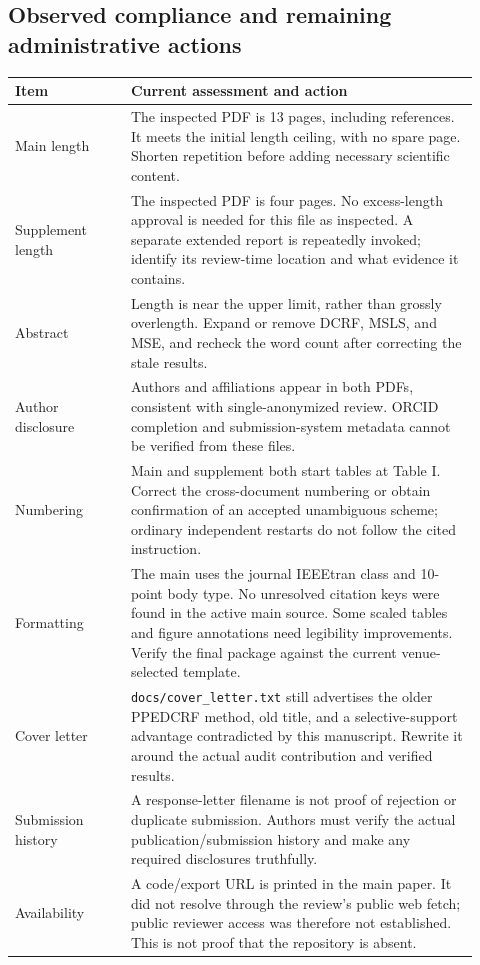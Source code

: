 \documentclass[11pt,a4paper]{article}
\newcommand{\file}[1]{\nolinkurl{#1}}
\begin{document}
\subsection{Observed compliance and remaining administrative actions}
\begin{longtable}{L{0.23\linewidth}L{0.69\linewidth}}
\toprule
Item & Current assessment and action \\
\midrule
\endhead
Main length & The inspected PDF is 13 pages, including references. It meets the initial length ceiling, with no spare page. Shorten repetition before adding necessary scientific content. \\
Supplement length & The inspected PDF is four pages. No excess-length approval is needed for this file as inspected. A separate extended report is repeatedly invoked; identify its review-time location and what evidence it contains. \\
Abstract & Length is near the upper limit, rather than grossly overlength. Expand or remove DCRF, MSLS, and MSE, and recheck the word count after correcting the stale results. \\
Author disclosure & Authors and affiliations appear in both PDFs, consistent with single-anonymized review. ORCID completion and submission-system metadata cannot be verified from these files. \\
Numbering & Main and supplement both start tables at Table I. Correct the cross-document numbering or obtain confirmation of an accepted unambiguous scheme; ordinary independent restarts do not follow the cited instruction. \\
Formatting & The main uses the journal IEEEtran class and 10-point body type. No unresolved citation keys were found in the active main source. Some scaled tables and figure annotations need legibility improvements. Verify the final package against the current venue-selected template. \\
Cover letter & \file{docs/cover_letter.txt} still advertises the older PPEDCRF method, old title, and a selective-support advantage contradicted by this manuscript. Rewrite it around the actual audit contribution and verified results. \\
Submission history & A response-letter filename is not proof of rejection or duplicate submission. Authors must verify the actual publication/submission history and make any required disclosures truthfully. \\
Availability & A code/export URL is printed in the main paper. It did not resolve through the review's public web fetch; public reviewer access was therefore not established. This is not proof that the repository is absent. \\
\bottomrule
\end{longtable}
\end{document}
